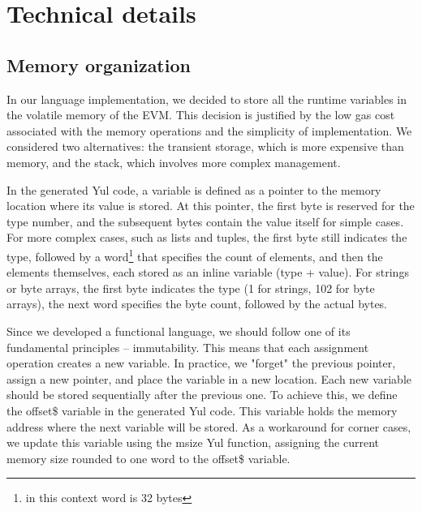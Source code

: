 \section{Technical details}

\subsection{Memory organization}
\label{sec:memory_organization}

In our language implementation, we decided to store all the runtime variables in the volatile memory of the EVM. This decision is justified by the low gas cost associated with the memory operations and the simplicity of implementation. We considered two alternatives: the transient storage, which is more expensive than memory, and the stack, which involves more complex management.

In the generated Yul code, a variable is defined as a pointer to the memory location where its value is stored. At this pointer, the first byte is reserved for the type number, and the subsequent bytes contain the value itself for simple cases. For more complex cases, such as lists and tuples, the first byte still indicates the type, followed by a word\footnote{in this context word is 32 bytes} that specifies the count of elements, and then the elements themselves, each stored as an inline variable (type + value). For strings or byte arrays, the first byte indicates the type (1 for strings, 102 for byte arrays), the next word specifies the byte count, followed by the actual bytes.

Since we developed a functional language, we should follow one of its fundamental principles -- immutability. This means that each assignment operation creates a new variable. In practice, we "forget" the previous pointer, assign a new pointer, and place the variable in a new location. Each new variable should be stored sequentially after the previous one. To achieve this, we define the offset\$ variable in the generated Yul code. This variable holds the memory address where the next variable will be stored. As a workaround for corner cases, we update this variable using the msize Yul function, assigning the current memory size rounded to one word to the offset\$ variable.

